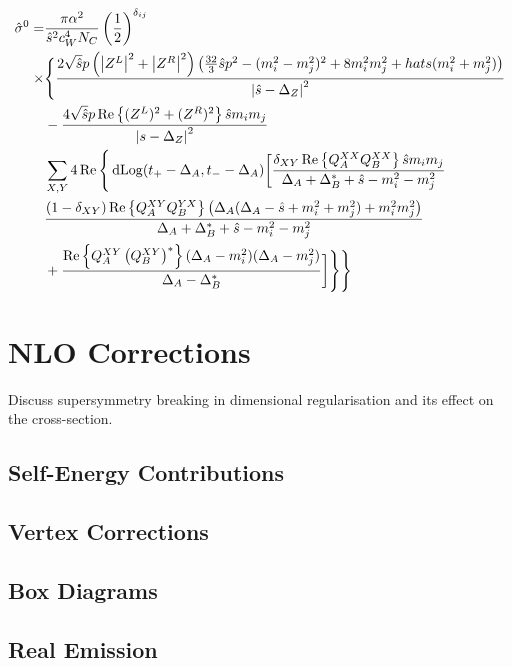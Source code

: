 \documentclass[../main.tex]{subfiles}
\begin{document}
\begin{temporary}
	\begin{align}
		\hat{\sigma}^0 = & \frac{\pi \alpha^2}{\hat{s}^2 c_W^4 N_C}
		\left(\frac{1}{2}\right)^{\delta_{ij}}
		\\
		\times           & \Bigg\{
		\frac{2\sqrt{\hat{s}}p\left(\left|Z^L\right|^2 + \left|Z^R\right|^2\right)
			\left(\frac{32}{3}\hat{s} p^2 - (m_i^2-m_j^2)^2 +
				8m_i^2 m_j^2 +
				hat{s}(m_i^2+m_j^2)\right)}{\left|\hat{s}-\Delta_Z\right|^2}
		\\
		                 & - \frac{4\sqrt{\hat{s}}p\operatorname{Re}\left\{(Z^L)^2 +
				(Z^R)^2\right\} \hat{s} m_i m_j}{\left|s-\Delta_Z\right|^2}
		\\
		                 & \sum_{X,Y} 4\operatorname{Re}\Bigg\{
		\operatorname{dLog}(t_+ - \Delta_A, t_- - \Delta_A) \bigg[
		\frac{\delta_{XY}\operatorname{Re}\left\{Q_A^{XX}Q_B^{XX}\right\}
		\hat{s}m_im_j}{\Delta_A
		+ \Delta_B^\ast + \hat{s} - m_i^2 - m_j^2}
		\\
		                 & \frac{(1-\delta_{XY})\operatorname{Re}\left\{Q_A^{XY}Q_B^{YX}\right\}
		\left(\Delta_A(\Delta_A-\hat{s}+m_i^2+m_j^2) + m_i^2
			m_j^2\right)}{\Delta_A +
		\Delta_B^\ast + \hat{s} - m_i^2 - m_j^2}
		\\
		                 & + \frac{\operatorname{Re}\left\{Q_A^{XY}
		\left(Q_B^{XY}\right)^\ast\right\} (\Delta_A - m_i^2)(\Delta_A -
		m_j^2)}{\Delta_A -
		\Delta_B^\ast} \bigg] \Bigg\}
		\Bigg\}
	\end{align}
\end{temporary}

\section{NLO Corrections}
\begin{TODO}
	\item Discuss supersymmetry breaking in dimensional regularisation and
	its effect on
	the cross-section.
\end{TODO}
\subsection{Self-Energy Contributions}

\begin{figure}
	\centering
	\caption{}
	\label{pc:fig:s_channel_se}
\end{figure}

\subsection{Vertex Corrections}

\subsection{Box Diagrams}

\subsection{Real Emission}
\end{document}
